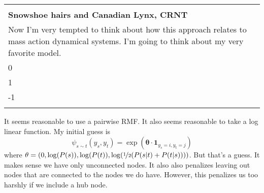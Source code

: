 \documentclass[10pt]{article}
\theoremstyle{definition}
\numberwithin{theorem}{section}
\numberwithin{definition}{section}
\numberwithin{lemma}{section}
\numberwithin{corollary}{section}
\numberwithin{clm}{section}
\numberwithin{rmk}{section}
\newenvironment{inbox}[1]
{\begin{center}
		\begin{tabular}{|p{0.9\textwidth}|}
			\hline\\
			{\bf #1}\\
		}
		{ 
			\\\\\hline
		\end{tabular} 
	\end{center}
}
\newcommand{\nhalf}{\nicefrac{1}{2}}
\renewcommand{\b}{\bm}
\newcommand{\ka}{\kappa}
\begin{document}
\begin{inbox}{Snowshoe hairs and Canadian Lynx, CRNT}
Now I'm very tempted to think about how this approach relates to mass action dynamical systems. I'm going to think about my very favorite model.
\[
\b{\dot{x}} = \ka_1 x \begin{pmatrix} 1 \\ 0 \end{pmatrix} + \ka_2 xy \begin{pmatrix}
-1 \\ 1
\end{pmatrix} + \ka_3 y \begin{pmatrix}
0\\-1
\end{pmatrix}
\]
Well. Yes. But there is only one maximal clique so $P(\b{x}) = \psi (\b{x})$ and that's just whatever it is. We know that it evolves according to the stochastic mass action equations. In fact, the result that the stationary distribution is a product of poissons for a complex balanced system can be thought of as fitting into this framework. I wonder if you could use this theory to re-prove that? Recall that the stationary distribution for a complex balanced system with equilibrium $\b{c}$ is 
\[
\pi(\b{x}) = \frac{1}{Z} \prod_{i=1}^d \frac{c_i^{x_i}}{x_i!}
\]
so here we have that
\[
\psi_c = \prod_{i \in c} \frac{c_i^{x_i}}{x_i!}
\]
or taking cliques to be just singletons
\[
\psi_i = \frac{c_i^{x_i}}{x_i !}
\]	
I can't think of any way to arrive upon that directly, and so prove the result from this direction. Also, This is even more general than a MRF, as it has self-loops. Self loops play the role of time update. In fact, one might say that a MC is to a MRF as an ODE is to a PDE. Then, self loops in the MRF correspond to time derivatives or forcing appearing in the PDE.
\end{inbox}

It seems reasonable to use a pairwise RMF. It also seems reasonable to take a log linear function. My initial guess is
\[
\psi_{s\sim t} (y_s,y_t) = \exp(\b{\theta} \cdot \b{1}_{y_s = i,y_t = j})
\]
where $\theta = (0,\log(P(s)), \log(P(t)),\log(\nhalf(P(s|t) + P(t|s))))$. But that's a guess. It makes sense we have only unconnected nodes. It also also penalizes leaving out nodes that are connected to the nodes we do have. However, this penalizes us too harshly if we include a hub node.
\end{document}
